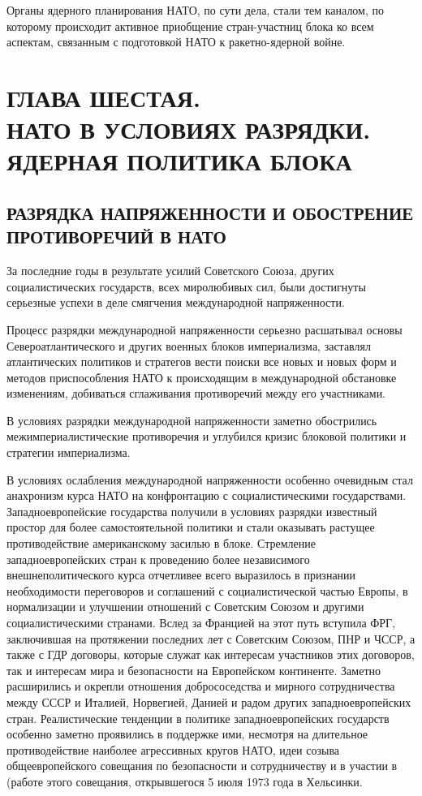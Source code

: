 \documentclass[12pt, a4paper, openany]{book}
\begin{document}
	Органы ядерного планирования НАТО, по сути дела, стали тем каналом, по которому происходит активное приобщение стран-участниц блока ко всем аспектам, связанным с подготовкой НАТО к ракетно-ядерной войне.
	
					\newpage
	\section[Глава шестая. НАТО В УСЛОВИЯХ РАЗРЯДКИ. ЯДЕРНАЯ ПОЛИТИКА БЛОКА]{\center ГЛАВА ШЕСТАЯ.\\ \textbf{НАТО В УСЛОВИЯХ РАЗРЯДКИ. ЯДЕРНАЯ ПОЛИТИКА БЛОКА}}	
	\subsection[Разрядка напряженности и обострение противоречий в НАТО]{\center РАЗРЯДКА НАПРЯЖЕННОСТИ И ОБОСТРЕНИЕ ПРОТИВОРЕЧИЙ В НАТО}	
	
	
	За последние годы в результате усилий Советского Союза, других социалистических государств, всех миролюбивых сил, были достигнуты серьезные успехи в деле смягчения международной напряженности.
	
	Процесс разрядки международной напряженности серьезно расшатывал основы Североатлантического и других военных блоков империализма, заставлял атлантических политиков и стратегов вести поиски все новых и новых форм и методов приспособления НАТО к происходящим в международной обстановке изменениям, добиваться сглаживания противоречий между его участниками.
	
	В условиях разрядки международной напряженности заметно обострились межимпериалистические противоречия и углубился кризис блоковой политики и стратегии империализма.
	
	В условиях ослабления международной напряженности особенно очевидным стал анахронизм курса НАТО на конфронтацию с социалистическими государствами. Западноевропейские государства получили в условиях разрядки известный простор для более самостоятельной политики и стали оказывать растущее противодействие американскому засилью в блоке. Стремление западноевропейских стран к проведению более независимого внешнеполитического курса отчетливее всего выразилось в признании необходимости переговоров и соглашений с социалистической частью Европы, в нормализации и улучшении отношений с Советским Союзом и другими социалистическими странами. Вслед за Францией на этот путь вступила ФРГ, заключившая на протяжении последних лет с Советским Союзом, ПНР и ЧССР, а также с ГДР договоры, которые служат как интересам участников этих договоров, так и интересам мира и безопасности на Европейском континенте. Заметно расширились и окрепли отношения добрососедства и мирного сотрудничества между СССР и Италией, Норвегией, Данией и радом других западноевропейских стран. Реалистические тенденции в политике западноевропейских государств особенно заметно проявились в поддержке ими, несмотря на длительное противодействие наиболее агрессивных кругов НАТО, идеи созыва общеевропейского совещания по безопасности и сотрудничеству и в участии в (работе этого совещания, открывшегося 5 июля 1973 года в Хельсинки.
	
\end{document}
